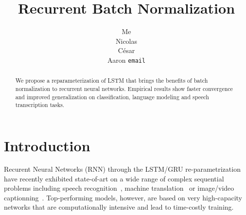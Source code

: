 \documentclass{article} %
\title{Recurrent Batch Normalization}
\author{
Me \\
\And
Nicolas \\
\And
C\'esar \\
\And
Aaron
\texttt{email} \\
}
\begin{document}
\maketitle

\begin{abstract}
We propose a reparameterization of LSTM that brings the benefits of batch normalization to recurrent neural networks.
Empirical results show faster convergence and improved generalization on classification, language modeling and speech transcription tasks.
\end{abstract}

\section{Introduction}









Recurent Neural Networks (RNN)  through the LSTM/GRU re-parametrization~\cite{lstm,cho2014learning} have recently exhibited state-of-art on a wide range of complex sequential problems including speech recognition~\cite{baidu}, machine translation~\cite{bahdanau2014neural} or image/video captionning~\cite{xu2015show,yao2015describing}.
Top-performing models, however, are based on very high-capacity networks that are computationally intensive and lead to time-costly training.
\end{document}
